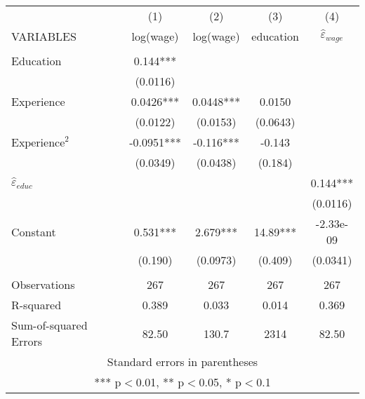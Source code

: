 \begin{tabular}{lcccc} \hline
 & (1) & (2) & (3) & (4) \\
VARIABLES & log(wage) & log(wage) & education & $\hat{\varepsilon}_{wage}$ \\ \hline
 &  &  &  &  \\
Education & 0.144*** &  &  &  \\
 & (0.0116) &  &  &  \\
Experience & 0.0426*** & 0.0448*** & 0.0150 &  \\
 & (0.0122) & (0.0153) & (0.0643) &  \\
$\text{Experience}^2$ & -0.0951*** & -0.116*** & -0.143 &  \\
 & (0.0349) & (0.0438) & (0.184) &  \\
$\hat{\varepsilon}_{educ}$ &  &  &  & 0.144*** \\
 &  &  &  & (0.0116) \\
Constant & 0.531*** & 2.679*** & 14.89*** & -2.33e-09 \\
 & (0.190) & (0.0973) & (0.409) & (0.0341) \\
 &  &  &  &  \\
Observations & 267 & 267 & 267 & 267 \\
R-squared & 0.389 & 0.033 & 0.014 & 0.369 \\
 Sum-of-squared Errors & 82.50 & 130.7 & 2314 & 82.50 \\ \hline
\multicolumn{5}{c}{ Standard errors in parentheses} \\
\multicolumn{5}{c}{ *** p$<$0.01, ** p$<$0.05, * p$<$0.1} \\
\end{tabular}

